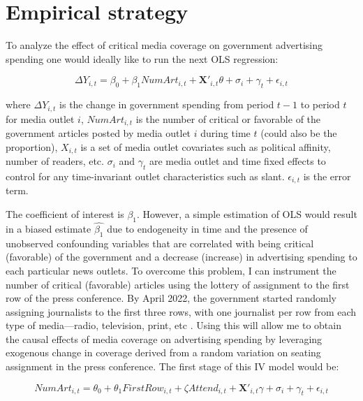 \section{Empirical strategy}
\label{sec:emp_strategy}

To analyze the effect of critical media coverage on government advertising spending one would ideally like to run the next OLS regression: 

\begin{equation}
\label{eq:OLS}
    \Delta Y_{i,t} = \beta_0 + \beta_1 NumArt_{i, t} + \mathbf{X'}_{i,t}\theta + \sigma_i + \gamma_t + \epsilon_{i, t}
\end{equation}

\noindent where $\Delta Y_{i,t}$ is the change in government spending from period $t-1$ to period $t$ for media outlet $i$, $NumArt_{i, t}$ is the number of critical or favorable of the government articles posted by media outlet $i$ during time $t$ (could also be the proportion), $X_{i, t}$ is a set of media outlet covariates such as political affinity, number of readers, etc. $\sigma_i$ and $\gamma_t$ are media outlet and time fixed effects to control for any time-invariant outlet characteristics such as slant. $\epsilon_{i, t}$ is the error term. 

The coefficient of interest is $\beta_1$. However, a simple estimation of OLS would result in a biased estimate $\hat{\beta_1}$ due to endogeneity in time and the presence of unobserved confounding variables that are correlated with being critical (favorable) of the government and a decrease (increase) in advertising spending to each particular news outlets. To overcome this problem, I can instrument the number of critical (favorable) articles using the lottery of assignment to the first row of the press conference. By April 2022, the government started randomly assigning journalists to the first three rows, with one journalist per row from each type of media—radio, television, print, etc \citep{Tombola-Financiero}. Using this will allow me to obtain the causal effects of media coverage on advertising spending by leveraging exogenous change in coverage derived from a random variation on seating assignment in the press conference. The first stage of this IV model would be: 

$$NumArt_{i, t} = \theta_0 + \theta_1 FirstRow_{i, t} + \zeta Attend_{i, t} + \mathbf{X'}_{i,t}\gamma + \sigma_i + \gamma_t + \epsilon_{i, t}$$

